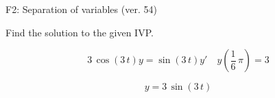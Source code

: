 \begin{exercise}
  \begin{exerciseTitle}F2: Separation of variables (ver. 54)\end{exerciseTitle}
  \begin{exerciseStatement}
    
Find the solution to the given IVP.

    
\[3 \, \cos\left(3 \, t\right) y= \sin\left(3 \, t\right) y'\hspace{1em} y\left( \frac{1}{6} \, \pi \right)= 3\]

  \end{exerciseStatement}
  \begin{exerciseAnswer}
    
\[y= 3 \, \sin\left(3 \, t\right)\]

  \end{exerciseAnswer}
\end{exercise}
